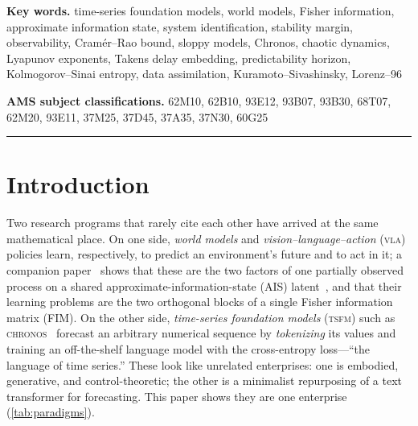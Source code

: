 \documentclass[10pt]{article}
\theoremstyle{plain}
\theoremstyle{definition}
\theoremstyle{remark}
\newcommand{\TSFM}{\textsc{tsfm}}
\newcommand{\VLA}{\textsc{vla}}
\newcommand{\Chronos}{\textsc{chronos}}
\begin{document}
\begin{center}\small
\textbf{Key words.} time-series foundation models, world models, Fisher
information, approximate information state, system identification, stability
margin, observability, Cram\'er--Rao bound, sloppy models, Chronos, chaotic
dynamics, Lyapunov exponents, Takens delay embedding, predictability horizon,
Kolmogorov--Sinai entropy, data assimilation, Kuramoto--Sivashinsky, Lorenz--96
\end{center}
\begin{center}\small
\textbf{AMS subject classifications.}
62M10, 62B10, 93E12, 93B07, 93B30, 68T07, 62M20, 93E11,
37M25, 37D45, 37A35, 37N30, 60G25
\end{center}
\bigskip\hrule\bigskip

\section{Introduction}
\label{sec:intro}

Two research programs that rarely cite each other have arrived at the same
mathematical place. On one side, \emph{world models} and
\emph{vision--language--action} (\VLA) policies learn, respectively, to predict
an environment's future and to act in it; a companion paper~\cite{wamvla} shows
that these are the two factors of one partially observed process on a shared
approximate-information-state (AIS) latent~\cite{ais2022}, and that their
learning problems are the two orthogonal blocks of a single Fisher information
matrix (FIM). On the other side, \emph{time-series foundation models} (\TSFM)
such as \Chronos~\cite{chronos} forecast an arbitrary numerical sequence by
\emph{tokenizing} its values and training an off-the-shelf language model with
the cross-entropy loss---``the language of time series.'' These look like
unrelated enterprises: one is embodied, generative, and control-theoretic; the
other is a minimalist repurposing of a text transformer for forecasting. This
paper shows they are one enterprise (\cref{tab:paradigms}).
\end{document}
